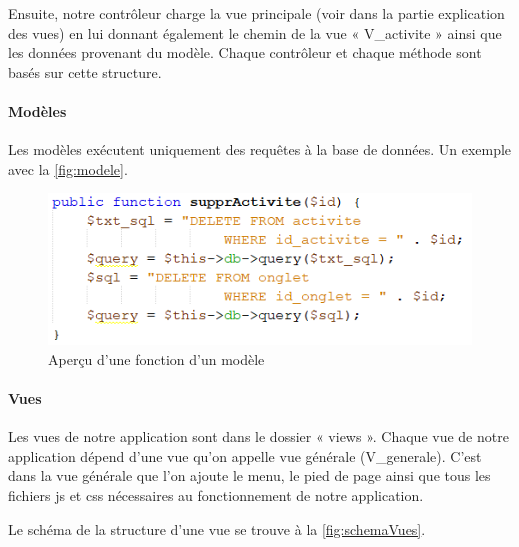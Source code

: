\documentclass[noposter]{polytech/polytech}
\begin{document}
Ensuite, notre contrôleur charge la vue principale (voir dans la partie explication des vues) en lui donnant également le chemin de la vue « V\_activite » ainsi que les données provenant du modèle. Chaque contrôleur et chaque méthode sont basés sur cette structure. 

\paragraph{Modèles}

Les modèles exécutent uniquement des requêtes à la base de données. Un exemple avec la \autoref{fig:modele}.

\begin{figure}
	\includegraphics[scale=1]{images/modele}
	\caption{Aperçu d'une fonction d'un modèle}
	\label{fig:modele}
\end{figure}


\paragraph{Vues}

Les vues de notre application sont dans le dossier « views ». Chaque vue de notre application dépend d'une vue qu'on appelle vue générale (V\_generale). C'est dans la vue générale que l'on ajoute le menu, le pied de page ainsi que tous les fichiers js et css nécessaires au fonctionnement de notre application. 

Le schéma de la structure d'une vue se trouve à la \autoref{fig:schemaVues}.
\end{document}
